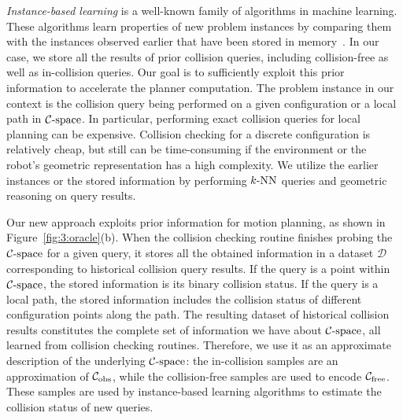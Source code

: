 \emph{Instance-based learning} is a well-known family of algorithms in machine learning. These algorithms learn properties of new problem instances by comparing them with the instances observed earlier that have been stored in memory~\cite{Russell:2003}. In our case, we store all the results of prior collision queries, including collision-free as well as in-collision queries. Our goal is to sufficiently exploit this prior information to accelerate the planner computation. The problem instance in our context is the collision query being performed on a given configuration or a local path in $\mathcal C\text{-space}$. In particular, performing exact collision queries for local planning can be expensive. Collision checking for a discrete configuration is relatively cheap, but still can be time-consuming if the environment or the robot's geometric representation has a high complexity. We utilize the earlier instances or the stored information by performing $k\text{-NN}$ queries and geometric reasoning on query results.

Our new approach exploits prior information for motion planning, as shown in Figure~\ref{fig:3:oracle}(b). When the collision checking routine finishes probing the $\mathcal C\text{-space}$ for a given query, it stores all the obtained information in a dataset $\mathcal D$ corresponding to historical collision query results. If the query is a point within $\mathcal C\text{-space}$, the stored information is its binary collision status. If the query is a local path, the stored information includes the collision status of different configuration points along the path. The resulting dataset of historical collision results constitutes the complete set of information we have about $\mathcal C\text{-space}$, all learned from collision checking routines. Therefore, we use it as an approximate description of the underlying $\mathcal C\text{-space}$: the in-collision samples are an approximation of $\mathcal C_{\text{obs}}$, while the collision-free samples are used to encode $\mathcal C_{\text{free}}$. These samples are used by instance-based learning algorithms to estimate the collision status of new queries.

